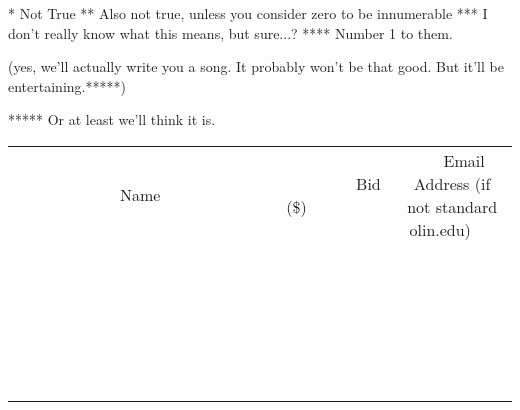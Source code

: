 \documentclass[11pt]{article}
\begin{document}
* Not True
** Also not true, unless you consider zero to be innumerable
*** I don't really know what this means, but sure...?
**** Number 1 to them.

(yes, we'll actually write you a song. It probably won't be that good. But it'll be entertaining.*****)

***** Or at least we'll think it is.
\\[6ex]
\begin{tabular}{c c c}
~~~~~~~~~~~~~Name~~~~~~~~~~~~~ & ~~~~~~~~~Bid (\$)~~~~~~~~~  & ~~~Email Address (if not standard olin.edu)~~~\\
 & & \\
\hline
 & & \\
\hline
 & & \\
\hline
 & & \\
\hline
 & & \\
\hline
 & & \\
\hline
 & & \\
\hline
 & & \\
\hline
 & & \\
\hline
 & & \\
\hline
 & & \\
\hline
 & & \\
\hline
 & & \\
\hline
 & & \\
\hline
 & & \\
\hline
 & & \\
\hline
 & & \\
\hline
 & & \\
\hline
 & & \\
\hline
 & & \\
\hline
 & & \\
\hline
 & & \\
\hline
 & & \\
\hline
 & & \\
\hline
 & & \\
\hline
 & & \\
\hline
\end{tabular}
\newpage
\end{document}
